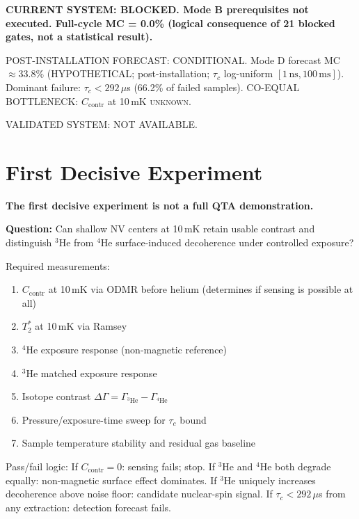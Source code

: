 \documentclass[12pt,a4paper]{article}
\newcommand{\unknown}{\textsc{unknown}}
\newcommand{\verdictbox}[1]{%
  \vspace{0.5em}\par
  \noindent\colorbox{yellow!30}{\parbox{\dimexpr\linewidth-2\fboxsep}{\bfseries #1}}\par
  \vspace{0.5em}
}
\begin{document}
\verdictbox{CURRENT SYSTEM: BLOCKED. Mode B prerequisites not executed.
Full-cycle MC = 0.0\% (logical consequence of 21 blocked gates, not a statistical result).

POST-INSTALLATION FORECAST: CONDITIONAL.
Mode D forecast MC $\approx 33.8\%$ (HYPOTHETICAL; post-installation; $\tau_c$ log-uniform $[1\,\mathrm{ns}, 100\,\mathrm{ms}]$).
Dominant failure: $\tau_c < 292\,\mu$s (66.2\% of failed samples).
CO-EQUAL BOTTLENECK: $C_\mathrm{contr}$ at 10\,mK \unknown{}.

VALIDATED SYSTEM: NOT AVAILABLE.}

\section{First Decisive Experiment}
\label{sec:firstexp}

\textbf{The first decisive experiment is not a full QTA demonstration.}

\textbf{Question:} Can shallow NV centers at 10\,mK retain usable contrast
and distinguish $^3$He from $^4$He surface-induced decoherence under controlled exposure?

Required measurements:
\begin{enumerate}[noitemsep]
  \item $C_\mathrm{contr}$ at 10\,mK via ODMR before helium (determines if sensing is possible at all)
  \item $T_2^*$ at 10\,mK via Ramsey
  \item $^4$He exposure response (non-magnetic reference)
  \item $^3$He matched exposure response
  \item Isotope contrast $\Delta\Gamma = \Gamma_{^3\mathrm{He}} - \Gamma_{^4\mathrm{He}}$
  \item Pressure/exposure-time sweep for $\tau_c$ bound
  \item Sample temperature stability and residual gas baseline
\end{enumerate}

Pass/fail logic:
If $C_\mathrm{contr} = 0$: sensing fails; stop.
If $^3$He and $^4$He both degrade equally: non-magnetic surface effect dominates.
If $^3$He uniquely increases decoherence above noise floor: candidate nuclear-spin signal.
If $\tau_c < 292\,\mu$s from any extraction: detection forecast fails.
\end{document}
